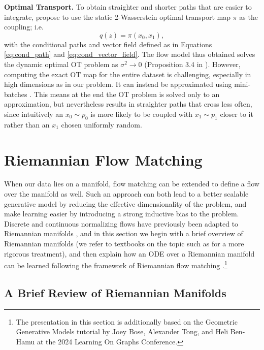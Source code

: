 \textbf{Optimal Transport.} To obtain straighter and shorter paths that are easier to integrate, \citet{tongImprovingGeneralizingFlowbased2023} propose to use the static 2-Wasserstein optimal transport map $\pi$ as the coupling; i.e.
\begin{equation}
    q(z) = \pi(x_0, x_1),
\end{equation}
with the conditional paths and vector field defined as in Equations \ref{eq:cond_path} and \ref{eq:cond_vector_field}. The flow model thus obtained solves the dynamic optimal OT problem as $\sigma^2 \to 0$ (Proposition 3.4 in \citep{tongImprovingGeneralizingFlowbased2023}). However, computing the exact OT map for the entire dataset is challenging, especially in high dimensions as in our problem. It can instead be approximated using mini-batches \citep{fatrasMinibatchOptimalTransport2021}. This means at the end the OT problem is solved only to an approximation, but nevertheless results in straighter paths that cross less often, since intuitively an $x_0 \sim p_0$ is more likely to be coupled with $x_1 \sim p_1$ closer to it rather than an $x_1$ chosen uniformly random.

\section{Riemannian Flow Matching} \label{sec:riemannian_fm}

When our data lies on a manifold, flow matching can be extended to define a flow over the manifold as well. Such an approach can both lead to a better scalable generative model by reducing the effective dimensionality of the problem, and make learning easier by introducing a strong inductive bias to the problem.  Discrete and continuous normalizing flows have previously been adapted to Riemannian manifolds \citep{gemiciNormalizingFlowsRiemannian2016,mathieuRiemannianContinuousNormalizing2020,louNeuralManifoldOrdinary2020}, and in this section we begin with a brief overview of Riemannian manifolds (we refer to textbooks on the topic such as \citep{johnm.leeIntroductionRiemannianManifolds2018} for a more rigorous treatment), and then explain how an ODE over a Riemannian manifold can be learned following the framework of Riemannian flow matching \citep{chenRiemannianFlowMatching2023}.\footnote{The presentation in this section is additionally based on the Geometric Generative Models tutorial by Joey Bose, Alexander Tong, and Heli Ben-Hamu at the 2024 Learning On Graphs Conference.} 

\subsection{A Brief Review of Riemannian Manifolds}

